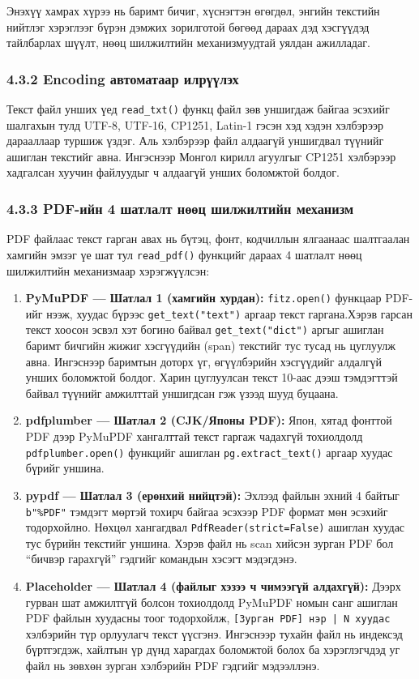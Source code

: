 \documentclass[11pt,a4paper]{article}
\begin{document}
Энэхүү хамрах хүрээ нь баримт бичиг, хүснэгтэн өгөгдөл, энгийн текстийн нийтлэг хэрэглээг бүрэн дэмжих зорилготой бөгөөд дараах дэд хэсгүүдэд тайлбарлах шүүлт, нөөц шилжилтийн механизмуудтай уялдан ажилладаг.

\subsubsection*{4.3.2 Encoding автоматаар илрүүлэх}

Текст файл унших үед \texttt{read\_txt()} функц файл зөв уншигдаж байгаа эсэхийг шалгахын тулд UTF-8, UTF-16, CP1251, Latin-1 гэсэн хэд хэдэн хэлбэрээр дарааллаар туршиж үздэг. Аль хэлбэрээр файл алдаагүй уншигдвал түүнийг ашиглан текстийг авна. Ингэснээр Монгол кирилл агуулгыг CP1251 хэлбэрээр хадгалсан хуучин файлуудыг ч алдаагүй унших боломжтой болдог.
\subsubsection*{4.3.3 PDF-ийн 4 шатлалт нөөц шилжилтийн механизм}

PDF файлаас текст гарган авах нь бүтэц, фонт, кодчиллын ялгаанаас шалтгаалан хамгийн эмзэг үе шат тул \texttt{read\_pdf()} функцийг дараах 4 шатлалт нөөц шилжилтийн механизмаар хэрэгжүүлсэн:

\begin{enumerate}
    \item \textbf{PyMuPDF — Шатлал 1 (хамгийн хурдан):}
      \texttt{fitz.open()} функцаар PDF-ийг нээж, хуудас бүрээс \texttt{get\_text("text")} аргаар текст гаргана.Хэрэв гарсан текст хоосон эсвэл хэт богино байвал \texttt{get\_text("dict")} аргыг ашиглан баримт бичгийн жижиг хэсгүүдийн (span) текстийг тус тусад нь цуглуулж авна. Ингэснээр баримтын доторх үг, өгүүлбэрийн хэсгүүдийг алдалгүй унших боломжтой болдог. Харин цуглуулсан текст 10-аас дээш тэмдэгттэй байвал түүнийг амжилттай уншигдсан гэж үзээд шууд буцаана.

    \item \textbf{pdfplumber — Шатлал 2 (CJK/Японы PDF):}
      Япон, хятад фонттой PDF дээр PyMuPDF хангалттай текст гаргаж чадахгүй тохиолдолд \texttt{ pdfplumber.open()} функцийг ашиглан  \texttt{pg.extract\_text()} аргаар хуудас бүрийг уншина.

    \item \textbf{pypdf — Шатлал 3 (ерөнхий нийцтэй):}
      Эхлээд файлын эхний 4 байтыг \texttt{b"\%PDF"} тэмдэгт мөртэй тохирч байгаа эсэхээр PDF формат мөн эсэхийг тодорхойлно. Нөхцөл хангагдвал \texttt{PdfReader(strict=False)} ашиглан хуудас тус бүрийн текстийг уншина. Хэрэв файл нь scan хийсэн зурган PDF бол ``бичвэр гарахгүй'' гэдгийг командын хэсэгт мэдэгдэнэ.

    \item \textbf{Placeholder — Шатлал 4 (файлыг хэзээ ч чимээгүй алдахгүй):}
      Дээрх гурван шат амжилтгүй болсон тохиолдолд PyMuPDF номын санг ашиглан PDF файлын хуудасны тоог тодорхойлж, \texttt{[Зурган PDF] нэр | N хуудас} хэлбэрийн түр орлуулагч текст үүсгэнэ. Ингэснээр тухайн файл нь индексэд бүртгэгдэж, хайлтын үр дүнд харагдах боломжтой болох ба хэрэглэгчдэд уг файл нь зөвхөн зурган хэлбэрийн PDF гэдгийг мэдээллэнэ.
\end{enumerate}
\end{document}
